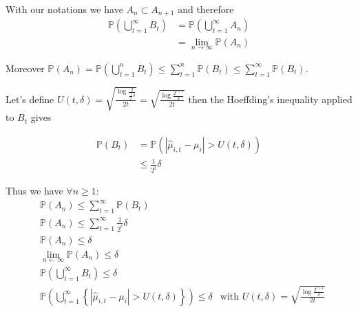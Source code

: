 \documentclass[a4paper]{article}
\newcommand{\wh}[1]{\widehat{#1}}
\begin{document}
With our notations we have $A_n \subset A_{n + 1}$ and therefore
\begin{equation*}
    \begin{aligned}
        \mathbb{P}\left(\bigcup_{t=1}^{\infty} B_t \right) & = \mathbb{P}\left(\bigcup_{t=1}^{\infty} A_n \right)      \\
                                                           & = \lim_{n \rightarrow \infty} \mathbb{P}\left(A_n \right)
    \end{aligned}
\end{equation*}

Moreover $\mathbb{P}\left(A_n\right) = \mathbb{P}\left(\bigcup_{t=1}^{n} B_t \right) \le \sum_{t=1}^n \mathbb{P}\left( B_t \right) \le \sum_{t=1}^\infty \mathbb{P}\left( B_t \right) $.

Let's define $U(t, \delta) = \sqrt{\frac{\log\frac{2}{\frac{1}{2^t}\delta}}{2t}} = \sqrt{\frac{\log\frac{2^{t+1}}{\delta}}{2t}}$
then the Hoeffding's inequality applied to $B_t$ gives

\begin{equation*}
    \begin{aligned}
        \mathbb{P}\left(B_t\right) & = \mathbb{P}\left(|\wh{\mu}_{i,t} - \mu_i| > U(t, \delta)\right) \\
                                   & \le \frac{1}{2^t}\delta
    \end{aligned}
\end{equation*}

Thus we have $\forall n \ge 1$:
\begin{equation*}
    \begin{aligned}
         & \mathbb{P}\left(A_n\right) \le \sum_{t=1}^\infty \mathbb{P}\left( B_t \right)                                                                                                                           \\
         & \mathbb{P}\left(A_n\right) \le \sum_{t=1}^\infty \frac{1}{2^t}\delta                                                                                                                                    \\
         & \mathbb{P}\left(A_n\right) \le \delta                                                                                                                                                                   \\
         & \lim_{n\leftarrow\infty}\mathbb{P}\left(A_n\right) \le \delta                                                                                                                                           \\
         & \mathbb{P}\left(\bigcup_{t=1}^{\infty} B_t \right) \le \delta                                                                                                                                           \\
         & \mathbb{P}\left(\bigcup_{t=1}^{\infty} \left\{ | \wh{\mu}_{i,t} - \mu_i | > U(t,\delta)\right\} \right)  \leq \delta & \text{with } \boxed{U(t, \delta) = \sqrt{\frac{\log\frac{2^{t+1}}{\delta}}{2t}}} \\
    \end{aligned}
\end{equation*}
\end{document}
